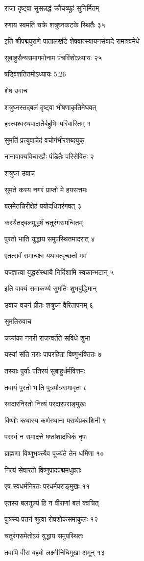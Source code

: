 राजा दृष्ट्वा सुसन्नद्धं क्रौंचव्यूहं सुनिर्मितम्

रणाय स्वमतिं चक्रे शत्रुघ्नकटके स्थितैः ३५

इति श्रीपद्मपुराणे पातालखंडे शेषवात्स्यायनसंवादे रामाश्वमेधे

सुबाहुसैन्यसमागमोनाम पंचविंशोऽध्यायः २५

षड्विंशतितमोऽध्यायः 5.26

शेष उवाच

शत्रुघ्नस्तद्बलं दृष्ट्वा भीषणाकृतिमेघवत्

हस्त्यश्वरथपादातैर्बहुभिः परिवारितम् १

सुमतिं प्रत्युवाचेदं वचोगंभीरशब्दयुक्

नानावाक्यविचारज्ञैः पंडितैः परिसेवितः २

शत्रुघ्न उवाच

सुमते कस्य नगरं प्राप्तो मे हयसत्तमः

बलमेतन्निरीक्षेहं पयोदधितरंगवत् ३

कस्यैतद्बलमुद्धर्षं चतुरंगसमन्वितम्

पुरतो भाति युद्धाय समुपस्थितमादरात् ४

एतत्सर्वं समाचक्ष्व यथावत्पृच्छतो मम

यज्ज्ञात्वा युद्धसंस्थायै निर्दिशामि स्वकान्भटान् ५

इति वाक्यं समाकर्ण्य सुमतिः शुभबुद्धिमान्

उवाच वचनं प्रीतः शत्रुघ्नं वैरितापनम् ६

सुमतिरुवाच

चक्रांका नगरी राजन्वर्तते सविधे शुभा

यस्यां संति नराः पापरहिता विष्णुभक्तितः ७

तस्याः पुर्याः पतिरयं सुबाहुर्धर्मवित्तमः

तवायं पुरतो भाति पुत्रपौत्रसमावृतः ८

स्वदारनिरतो नित्यं परदारपराङ्मुखः

विष्णोः कथास्य कर्णस्थाना परार्थप्रकाशिनी ९

परस्वं न समादत्ते षष्ठांशादधिकं नृपः

ब्राह्मणा विष्णुभक्त्यैव पूज्यंते तेन धर्मिणा १०

नित्यं सेवारतो विष्णुपादपद्ममधुव्रतः

एष स्वधर्मनिरतः परधर्मपराङ्मुखः ११

एतस्य बलतुल्यं हि न वीराणां बलं क्वचित्

पुत्रस्य पतनं श्रुत्वा रोषशोकसमाकुलः १२

चतुरंगसमेतोऽयं युद्धाय समुपस्थितः

तवापि वीरा बहवो लक्ष्मीनिधिमुखा अमून् १३

